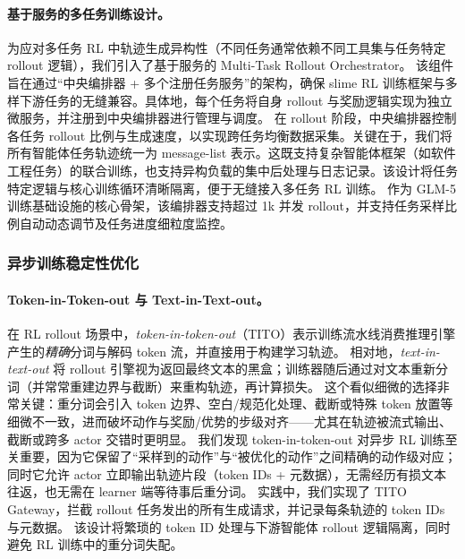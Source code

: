 \paragraph{基于服务的多任务训练设计。}
为应对多任务 RL 中轨迹生成异构性（不同任务通常依赖不同工具集与任务特定 rollout 逻辑），我们引入了基于服务的 Multi-Task Rollout Orchestrator。
该组件旨在通过“中央编排器 + 多个注册任务服务”的架构，确保 slime RL 训练框架与多样下游任务的无缝兼容。具体地，每个任务将自身 rollout 与奖励逻辑实现为独立微服务，并注册到中央编排器进行管理与调度。
在 rollout 阶段，中央编排器控制各任务 rollout 比例与生成速度，以实现跨任务均衡数据采集。关键在于，我们将所有智能体任务轨迹统一为 message-list 表示。这既支持复杂智能体框架（如软件工程任务）的联合训练，也支持异构负载的集中后处理与日志记录。该设计将任务特定逻辑与核心训练循环清晰隔离，便于无缝接入多任务 RL 训练。
作为 GLM-5 训练基础设施的核心骨架，该编排器支持超过 1k 并发 rollout，并支持任务采样比例自动动态调节及任务进度细粒度监控。


\subsubsection{异步训练稳定性优化}
\paragraph{Token-in-Token-out 与 Text-in-Text-out。}
在 RL rollout 场景中，\emph{token-in-token-out}（TITO）表示训练流水线消费推理引擎产生的\emph{精确}分词与解码 token 流，并直接用于构建学习轨迹。
相对地，\emph{text-in-text-out} 将 rollout 引擎视为返回最终文本的黑盒；训练器随后通过对文本重新分词（并常常重建边界与截断）来重构轨迹，再计算损失。
这个看似细微的选择非常关键：重分词会引入 token 边界、空白/规范化处理、截断或特殊 token 放置等细微不一致，进而破坏动作与奖励/优势的步级对齐——尤其在轨迹被流式输出、截断或跨多 actor 交错时更明显。
我们发现 token-in-token-out 对异步 RL 训练至关重要，因为它保留了“采样到的动作”与“被优化的动作”之间精确的动作级对应；同时它允许 actor 立即输出轨迹片段（token IDs + 元数据），无需经历有损文本往返，也无需在 learner 端等待事后重分词。
实践中，我们实现了 TITO Gateway，拦截 rollout 任务发出的所有生成请求，并记录每条轨迹的 token IDs 与元数据。
该设计将繁琐的 token ID 处理与下游智能体 rollout 逻辑隔离，同时避免 RL 训练中的重分词失配。


